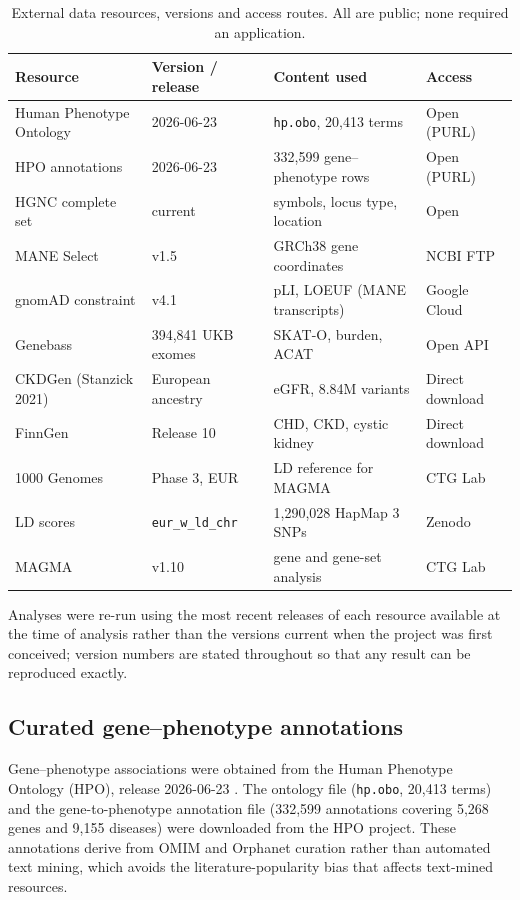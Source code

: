 \documentclass[11pt,a4paper]{article}
\begin{document}
\begin{table}[htbp]
\centering
\small
\caption{External data resources, versions and access routes. All are public; none required
an application.}
\label{tab:versions}
\begin{tabular}{llll}
\toprule
Resource & Version / release & Content used & Access \\
\midrule
Human Phenotype Ontology & 2026-06-23 & \texttt{hp.obo}, 20,413 terms & Open (PURL) \\
HPO annotations & 2026-06-23 & 332,599 gene--phenotype rows & Open (PURL) \\
HGNC complete set & current & symbols, locus type, location & Open \\
MANE Select & v1.5 & GRCh38 gene coordinates & NCBI FTP \\
gnomAD constraint & v4.1 & pLI, LOEUF (MANE transcripts) & Google Cloud \\
Genebass & 394,841 UKB exomes & SKAT-O, burden, ACAT & Open API \\
CKDGen (Stanzick 2021) & European ancestry & eGFR, 8.84M variants & Direct download \\
FinnGen & Release 10 & CHD, CKD, cystic kidney & Direct download \\
1000 Genomes & Phase 3, EUR & LD reference for MAGMA & CTG Lab \\
LD scores & \texttt{eur\_w\_ld\_chr} & 1,290,028 HapMap 3 SNPs & Zenodo \\
MAGMA & v1.10 & gene and gene-set analysis & CTG Lab \\
\bottomrule
\end{tabular}
\end{table}

Analyses were re-run using the most recent releases of each resource available at the time
of analysis rather than the versions current when the project was first conceived; version
numbers are stated throughout so that any result can be reproduced exactly.

\subsection{Curated gene--phenotype annotations}

Gene--phenotype associations were obtained from the Human Phenotype Ontology (HPO), release
2026-06-23 \cite{gargano2024}. The ontology file (\texttt{hp.obo}, 20,413 terms) and the
gene-to-phenotype annotation file (332,599 annotations covering 5,268 genes and 9,155
diseases) were downloaded from the HPO project. These annotations derive from OMIM and
Orphanet curation rather than automated text mining, which avoids the literature-popularity
bias that affects text-mined resources.
\end{document}
